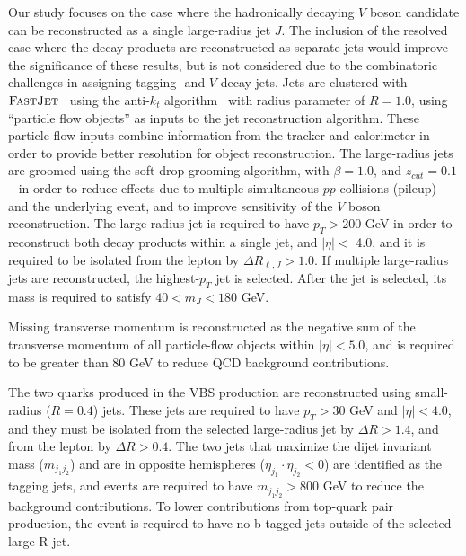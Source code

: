\documentclass[amsmath,amssymb,aps,prd,preprint,groupedaddress]{revtex4-2}
\begin{document}
Our study focuses on the case where the hadronically decaying $V$ boson candidate can be reconstructed as a single large-radius jet $J$.
The inclusion of the resolved case where the decay products are reconstructed as separate jets would improve the significance of these results, but is not considered due to the combinatoric challenges in assigning tagging- and $V$-decay jets.
Jets are clustered with $\textsc{FastJet}$~\cite{Cacciari:2011ma} using the anti-$k_t$ algorithm~\cite{Cacciari:2008gp} with radius parameter of $R=1.0$, using ``particle flow objects'' as inputs to the jet reconstruction algorithm. These particle flow inputs combine information from the tracker and calorimeter in order to provide better resolution for object reconstruction.
The large-radius jets are groomed using the soft-drop grooming algorithm, with $\beta=1.0$, and $z_{cut}=0.1$~\cite{Larkoski:2014wba} in order to reduce effects due to multiple simultaneous $pp$ collisions (pileup) and the underlying event, and to improve sensitivity of the $V$ boson reconstruction.
The large-radius jet is required to have $p_{T} > 200$ GeV in order to reconstruct both decay products within a single jet, and $|\eta| < $  4.0, and it is required to be isolated from the lepton by $\Delta R_{\ell, J} > 1.0$.
If multiple large-radius jets are reconstructed, the highest-$p_{T}$ jet is selected. 
After the jet is selected, its mass is required to satisfy $40 < m_{J} < 180$ GeV.

Missing transverse momentum is reconstructed as the negative sum of the transverse momentum of all particle-flow objects within $|\eta| < 5.0$, 
and is required to be greater than 80 GeV to reduce QCD background contributions.

The two quarks produced in the VBS production are reconstructed using small-radius ($R=0.4$) jets.
These jets are required to have $p_{T} > 30$ GeV and $|\eta| < 4.0$, and they must be isolated from the selected large-radius jet by $\Delta R > 1.4$, and from the lepton by $\Delta R > 0.4$.
The two jets that maximize the dijet invariant mass ($m_{j_{1}j_{2}}$) and are in opposite hemispheres ($\eta_{j_{1}} \cdot \eta_{j_{2}} < 0$) are identified as the tagging jets,
and events are required to have $m_{j_{1}j_{2}} > 800$ GeV to reduce the background contributions. 
To lower contributions from top-quark pair production, the event is required to have no b-tagged jets outside of the selected large-R jet.
\end{document}
